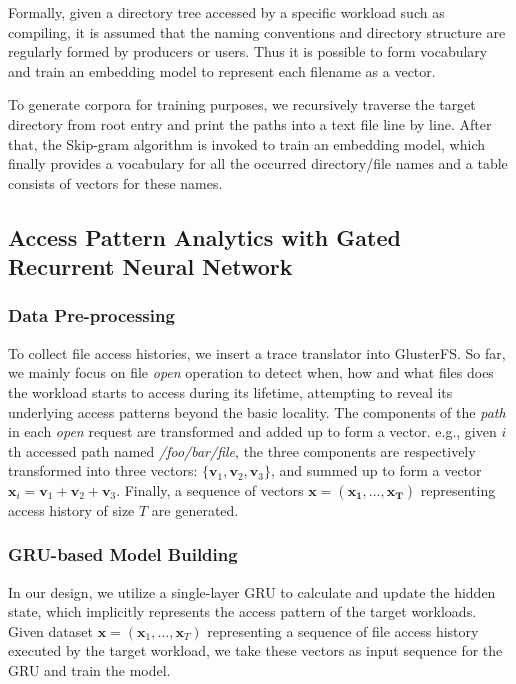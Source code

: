 \documentclass[conference]{IEEEtran}
\begin{document}
Formally, given a directory tree accessed by a specific workload such as compiling, 
it is assumed that the naming conventions and directory structure are regularly formed by producers or users.
Thus it is possible to form vocabulary and train an embedding model to represent each filename as a vector.

To generate corpora for training purposes,
we recursively traverse the target directory from root entry and print the paths into a text file line by line.
After that, the Skip-gram algorithm is invoked to train an embedding model, 
which finally provides a vocabulary for all the occurred directory/file names and a table consists of vectors for these names.


\subsection{Access Pattern Analytics with Gated Recurrent Neural Network}
\subsubsection{Data Pre-processing}
To collect file access histories, we insert a trace translator into GlusterFS.
So far, we mainly focus on file \textit{open} operation to detect when, how and what files does the workload starts to access during its lifetime,
attempting to reveal its underlying access patterns beyond the basic locality. 
The components of the \textit{path} in each \textit{open} request are transformed and added up to form a vector.
e.g., given $i$th accessed path named \textit{/foo/bar/file}, the three components are respectively transformed into three vectors: $\{\mathbf{v}_1, \mathbf{v}_2, \mathbf{v}_3\}$,
and summed up to form a vector $\mathbf{x}_i = \mathbf{v}_1 + \mathbf{v}_2 + \mathbf{v}_3$.
Finally, a sequence of vectors $\mathbf{x}=(\mathbf{x_1}, \dots, \mathbf{x_T})$ representing access history of size $T$ are generated.

\subsubsection{GRU-based Model Building}
In our design, we utilize a single-layer GRU to calculate and update the hidden state, which implicitly represents the access pattern of the target workloads. 
Given dataset $\mathbf{x} = (\mathbf{x}_1,\dots,\mathbf{x}_T)$ representing a sequence of file access history executed by the target workload, 
we take these vectors as input sequence for the GRU and train the model. 
\end{document}

